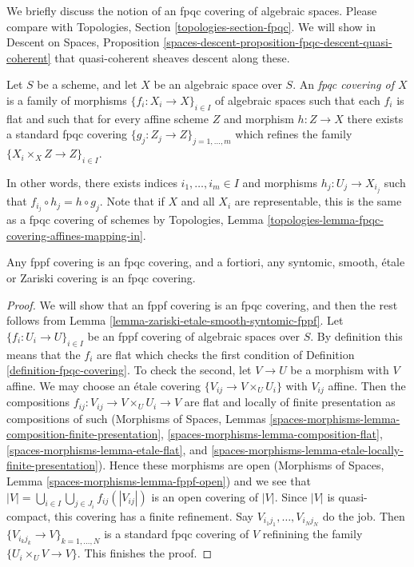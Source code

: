 \noindent
We briefly discuss the notion of an fpqc covering of algebraic spaces.
Please compare with
Topologies, Section \ref{topologies-section-fpqc}.
We will show in
Descent on Spaces,
Proposition \ref{spaces-descent-proposition-fpqc-descent-quasi-coherent}
that quasi-coherent sheaves descent along these.

\begin{definition}
\label{definition-fpqc-covering}
Let $S$ be a scheme, and let $X$ be an algebraic space over $S$.
An {\it fpqc covering of $X$} is a family of morphisms
$\{f_i : X_i \to X\}_{i \in I}$ of algebraic spaces
such that each $f_i$ is flat and such that for every affine scheme
$Z$ and morphism $h : Z \to X$ there exists a standard fpqc covering
$\{g_j : Z_j \to Z\}_{j = 1, \ldots, m}$ which refines the family
$\{X_i \times_X Z \to Z\}_{i \in I}$.
\end{definition}

\noindent
In other words, there exists indices $i_1, \ldots, i_m \in I$ and
morphisms $h_j : U_j \to X_{i_j}$ such that
$f_{i_j} \circ h_j = h \circ g_j$. Note that if $X$ and all $X_i$ are
representable, this is the same as a fpqc covering of schemes by
Topologies, Lemma \ref{topologies-lemma-fpqc-covering-affines-mapping-in}.

\begin{lemma}
\label{lemma-zariski-etale-smooth-syntomic-fppf-fpqc}
Any fppf covering is an fpqc covering, and a fortiori,
any syntomic, smooth, \'etale or Zariski covering is an fpqc covering.
\end{lemma}

\begin{proof}
We will show that an fppf covering is an fpqc covering, and then the
rest follows from
Lemma \ref{lemma-zariski-etale-smooth-syntomic-fppf}.
Let $\{f_i : U_i \to U\}_{i \in I}$ be an
fppf covering of algebraic spaces over $S$.
By definition this means that the $f_i$ are flat which checks the first
condition of Definition \ref{definition-fpqc-covering}. To check the
second, let $V \to U$ be a morphism with $V$ affine.
We may choose an \'etale covering $\{V_{ij} \to V \times_U U_i\}$
with $V_{ij}$ affine. Then the compositions
$f_{ij} : V_{ij} \to V \times_U U_i \to V$ are flat and locally of
finite presentation as compositions of such
(Morphisms of Spaces, Lemmas
\ref{spaces-morphisms-lemma-composition-finite-presentation},
\ref{spaces-morphisms-lemma-composition-flat},
\ref{spaces-morphisms-lemma-etale-flat}, and
\ref{spaces-morphisms-lemma-etale-locally-finite-presentation}).
Hence these morphisms are open
(Morphisms of Spaces, Lemma \ref{spaces-morphisms-lemma-fppf-open})
and we see that
$|V| = \bigcup_{i \in I} \bigcup_{j \in J_i} f_{ij}(|V_{ij}|)$
is an open covering of $|V|$.
Since $|V|$ is quasi-compact, this covering has a finite
refinement.
Say $V_{i_1j_1}, \ldots, V_{i_Nj_N}$ do the job.
Then $\{V_{i_kj_k} \to V\}_{k = 1, \ldots, N}$ is
a standard fpqc covering of $V$ refinining the family
$\{U_i \times_U V \to V\}$.
This finishes the proof.
\end{proof}

